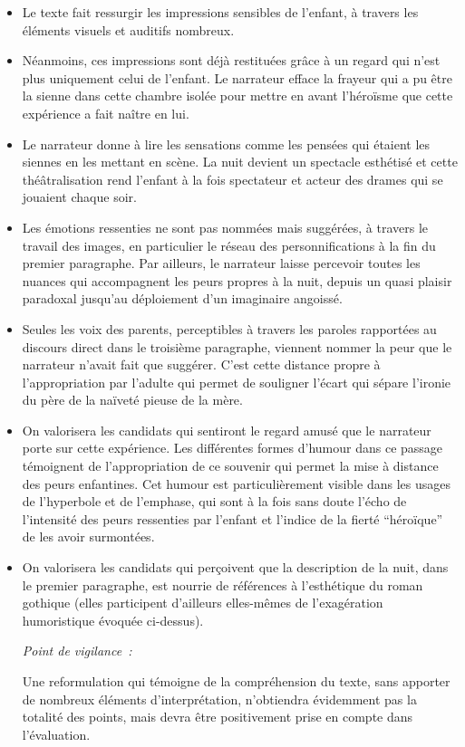 {\begin{itemize}
\item Le texte fait ressurgir les impressions sensibles de l'enfant, à travers les
éléments visuels et auditifs nombreux.
\item Néanmoins, ces impressions sont déjà restituées grâce à un regard qui n'est
plus uniquement celui de l'enfant. Le narrateur efface la frayeur qui a pu être la
sienne dans cette chambre isolée pour mettre en avant l'héroïsme que cette
expérience a fait naître en lui.
\item Le narrateur donne à lire les sensations comme les pensées qui étaient les
siennes en les mettant en scène. La nuit devient un spectacle esthétisé et cette
théâtralisation rend l'enfant à la fois spectateur et acteur des drames qui se
jouaient chaque soir.
\item Les émotions ressenties ne sont pas nommées mais suggérées, à travers le
travail des images, en particulier le réseau des personnifications à la fin du
premier paragraphe. Par ailleurs, le narrateur laisse percevoir toutes les
nuances qui accompagnent les peurs propres à la nuit, depuis un quasi plaisir
paradoxal jusqu'au déploiement d'un imaginaire angoissé.
\item Seules les voix des parents, perceptibles à travers les paroles rapportées au
discours direct dans le troisième paragraphe, viennent nommer la peur que le
narrateur n'avait fait que suggérer. C'est cette distance propre à l'appropriation
par l'adulte qui permet de souligner l'écart qui sépare l'ironie du père de la
naïveté pieuse de la mère.
\item On valorisera les candidats qui sentiront le regard amusé que le narrateur porte
sur cette expérience. Les différentes formes d'humour dans ce passage
témoignent de l'appropriation de ce souvenir qui permet la mise à distance des
peurs enfantines. Cet humour est particulièrement visible dans les usages de
l'hyperbole et de l'emphase, qui sont à la fois sans doute l'écho de l'intensité
des peurs ressenties par l'enfant et l'indice de la fierté “héroïque” de les avoir
surmontées.
\item On valorisera les candidats qui perçoivent que la description de la nuit, dans le
premier paragraphe, est nourrie de références à l'esthétique du roman gothique
(elles participent d'ailleurs elles-mêmes de l'exagération humoristique évoquée
ci-dessus).

\bigskip

\textit{Point de vigilance~:}

Une reformulation qui témoigne de la compréhension du texte, sans apporter
de nombreux éléments d'interprétation, n'obtiendra évidemment pas la totalité
des points, mais devra être positivement prise en compte dans l'évaluation.
\end{itemize}}%
